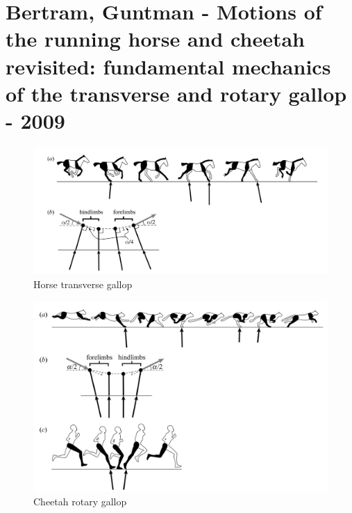\section{Bertram, Guntman - Motions of the running horse and cheetah revisited: fundamental mechanics of the transverse and rotary gallop - 2009}

\begin{figure}[h]
  \centering
  \includegraphics[width=140mm]{figs/HorseGallop}
  \caption{Horse transverse gallop}
  \label{horse}
\end{figure}

\begin{figure}[h]
  \centering
  \includegraphics[width=140mm]{figs/CheetahGallop}
  \caption{Cheetah rotary gallop}
  \label{cheetah}
\end{figure}

